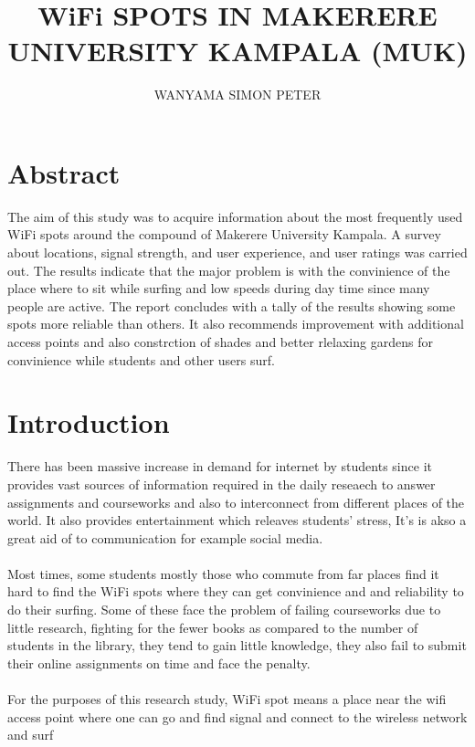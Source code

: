 \documentclass[12pt, a4paper]{article}
\begin{document}
\title{WiFi SPOTS IN MAKERERE UNIVERSITY KAMPALA (MUK)}
\author{WANYAMA SIMON PETER }
\maketitle
\clearpage
\section{Abstract}
The aim of this study was to acquire information about the most frequently used WiFi spots around the compound of Makerere University Kampala. A survey about locations, signal strength, and user experience, and user ratings was carried out. The results indicate that the major problem is with the convinience of the place where to sit while surfing and low speeds during day time since many people are active. The report concludes with a tally of the results showing some spots more reliable than others. It also recommends improvement with additional access points and also constrction of shades and better rlelaxing gardens for convinience while students and other users surf. 

\section{Introduction}
There has been massive increase in demand for internet by students since it provides vast sources of information required in the daily reseaech to answer assignments and courseworks and also to interconnect from different places of the world. It also provides entertainment which releaves students' stress, It's is akso a great aid of to communication for example social media.\\
 \\
Most times, some students mostly those who commute from far places find it hard to find the WiFi spots where they can get convinience and and reliability to do their surfing. Some of these face the problem of failing courseworks due to little research, fighting for the fewer books as compared to the number of students in the library, they tend to gain little knowledge, they also fail to submit their online assignments on time and face the penalty.\\
\\
 For the purposes of this research study, WiFi spot means a place near the wifi access point where one can go and find signal and connect to the wireless network and surf
\end{document}
